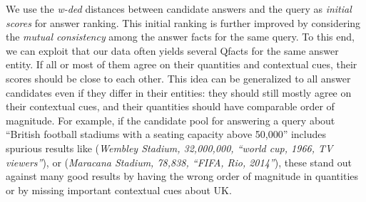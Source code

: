 %
\begin{comment}
Scoring using \textit{w-ded} only looks at the candidate Qfact itself 
(i.e., Qfacts are treated independently). As the query context is relatively short comparing to Qfacts context (combined from various parts of the table), this might put some noise in the results as several tiny cues from Qfact context can totally change its meaning. A potential solution to demote these noisy Qfacts, and as a result, promote good Qfacts is to consider also the similarity between them (i.e., similar Qfacts should be scored close to each other). 
We propose a consistency-based approach to re-score candidate Qfacts, as described below.
\end{comment}

We use the 
\textit{w-ded} distances
between
candidate answers and the query as 
{\em initial scores} for answer ranking.
This initial ranking is further improved by considering
the {\em mutual consistency} among the answer facts
for the same query.
To this end, we can exploit that our data often
yields several Qfacts for the same answer entity.
If all or most of them agree on their quantities and
contextual cues, 
their scores should be close
to each other.
This idea can be generalized to all answer candidates
even if they differ in their entities:
they should still mostly agree on their contextual cues,
and their quantities should have comparable order
of magnitude.
For example, if the candidate pool for answering
a query about 
``British football stadiums with a seating capacity above 50,000'' includes spurious results like
(\textit{Wembley Stadium, 32,000,000, 
``world cup, 1966, TV viewers''}), 
or 
(\textit{Maracana Stadium, 78,838,
``FIFA, Rio, 2014''}),
these stand out against many good results
by having the wrong order of magnitude in
quantities or by missing important contextual cues about UK.

